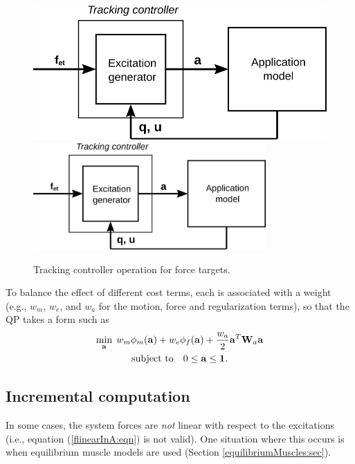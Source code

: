 \begin{figure}[ht]
\begin{center}
\iflatexml
   \includegraphics[]{images/trackingForces}
\else
   \includegraphics[width=3.5in]{images/trackingForces}
\fi
\end{center}
\caption{Tracking controller operation for force targets.}
\label{trackingForces:fig}
\end{figure}

To balance the effect of different cost terms, each is associated with
a weight (e.g., $w_m$, $w_e$, and $w_a$ for the motion, force and
regularization terms), so that the QP takes a form such as
%
\begin{gather}
\min_{{\bf a}} \; w_m \phi_m({\bf a}) + w_e \phi_f ({\bf a}) + \frac{w_a}{2} {\bf a}^T {\bf W}_a {\bf a} \notag \\
\text{subject to} \quad 0 \le {\bf a} \le {\bf 1}.
\label{fullQP:eqn}
\end{gather}
%

\subsection{Incremental computation}
\label{IncrementalComputation:sec}

In some cases, the system forces are {\it not} linear with respect to the
excitations (i.e., equation (\ref{flinearInA:eqn}) is not valid). One
situation where this occurs is when equilibrium muscle models are used
(Section \ref{equilibriumMuscles:sec}).


